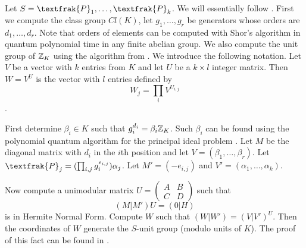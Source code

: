 Let $S=\textfrak{P}_1,\dots,\textfrak{P}_k$. We will essentially follow \cite[Algorithm 6.1]{simon2002solving}. First we compute the class group $Cl(K)$, let $g_1,\dots,g_r$ be generators whose orders are $d_1,\dots,d_r$. Note that orders of elements can be computed with Shor's algorithm in quantum polynomial time in any finite  abelian group. We also compute the unit group of $\mathbb{Z}_K$ using the algorithm from \cite{eisentrager2014quantum}. We introduce the following notation. Let $V$ be a vector with $k$ entries from $K$ and let $U$ be a $k\times l$ integer matrix. Then $W=V^U$ is the vector with $l$ entries defined by 
$$W_j=\prod_i V^{U_{i,j}}$$.

First determine $\beta_i\in K$ such that $g_i^{d_i}=\beta_i \mathbb{Z}_K$. Such $\beta_i$ can be found using the polynomial quantum algorithm for the principal ideal problem \cite{biasse2016efficient}. Let $M$ be the diagonal matrix with $d_i$ in the $i$th position and let $V=(\beta_1,\dots,\beta_r)$. Let $\textfrak{P}_j= (\prod_{i,j} g_i^{e_{i,j}})\alpha_j$. Let $M'=(-e_{i,j})$ and $V'=(\alpha_1,\dots,\alpha_k)$.

Now compute a unimodular matrix $U=\begin{pmatrix}
A&B \\
C&D
\end{pmatrix}$ such that 
$$(M|M')U=(0|H)$$ is in Hermite Normal Form. Compute $W$ such that $(W|W')=(V|V')^U$. Then the coordinates of $W$ generate the $S$-unit group (modulo units of $K$). The proof of this fact can be found in \cite[Section 6]{simon2002solving}. 

